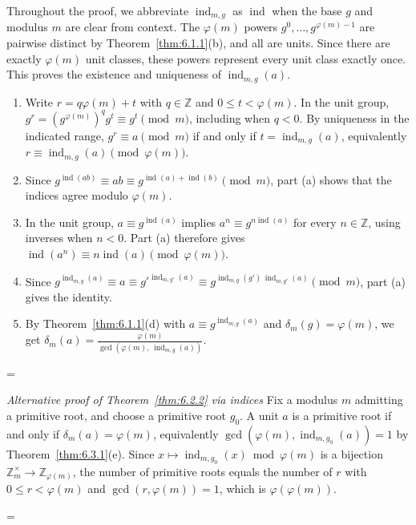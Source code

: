 \documentclass[11pt]{article}
\makeatletter
\theoremstyle{ntstyle}
\let\nt@closedisplay\]
\def\nt@guardedclose{\@ifnextchar\par{\nt@closeafterpar}{\@ifnextchar\end{\postdisplaypenalty\@M\nt@closedisplay}{\nt@closedisplay}}}
\def\nt@closeafterpar\par{\@ifnextchar\par{\nt@closeafterpar}{\@ifnextchar\end{\postdisplaypenalty\@M\nt@closedisplay\par}{\nt@closedisplay\par}}}
\renewenvironment{proof}[1][\proofname]{\par
  \pushQED{\qed}\normalfont\topsep\medskipamount\edef\nt@afterproof{\@endparpenalty=\the\@endparpenalty\relax}\@beginparpenalty\@M\@endparpenalty\@M\let\]\nt@guardedclose\trivlist\item[]\textit{#1\@addpunct{.}} \ignorespaces}{\ifvmode\addpenalty\@M\fi\popQED\nt@afterproof\endtrivlist\@endpefalse}
\newenvironment{altproof}[1][\proofname]{\begin{proof}[#1]\renewcommand{\qedsymbol}{}}{\end{proof}}
\newcommand{\ZmodUnits}[1]{\mathbb{Z}_{#1}^{\times}}
\DeclareMathOperator{\ind}{ind}
\makeatother
\begin{document}
\begin{proof} Throughout the proof, we abbreviate
	$\ind_{m,g}$ as $\ind$ when the base $g$
	and modulus $m$ are clear from context. The
	$\varphi(m)$ powers $g^{0},\ldots,g^{\varphi(m)-1}$ are pairwise
	distinct by Theorem~\ref{thm:6.1.1}(b), and all are units. Since there
	are exactly $\varphi(m)$ unit classes, these powers represent every
	unit class exactly once. This proves the existence and uniqueness of
	$\ind_{m,g}(a)$.

	\begin{enumerate}[label={\alph*)}]
		\item Write $r=q\varphi(m)+t$ with $q\in\mathbb{Z}$ and
		      $0\le t<\varphi(m)$. In the unit group,
		      $g^r=(g^{\varphi(m)})^qg^t\equiv g^t\pmod m$,
		      including when $q<0$. By uniqueness in the indicated range,
		      $g^r\equiv a\pmod m$ if and only if $t=\ind_{m,g}(a)$,
		      equivalently $r\equiv\ind_{m,g}(a)\pmod{\varphi(m)}$.
		\item Since $g^{\ind(ab)} \equiv ab \equiv
			      g^{\ind(a) + \ind(b)} \pmod{m}$, part (a) shows that the indices
		      agree modulo $\varphi(m)$.
		\item In the unit group, $a\equiv g^{\ind(a)}$ implies
		      $a^n\equiv g^{n\ind(a)}$ for every $n\in\mathbb{Z}$,
		      using inverses when $n<0$. Part (a) therefore gives
		      $\ind(a^n)\equiv n\ind(a)\pmod{\varphi(m)}$.
		\item Since $g^{\ind_{m,g}(a)} \equiv a \equiv
			      g'^{\ind_{m,g'}(a)} \equiv
			      g^{\ind_{m,g}(g')\, \ind_{m,g'}(a)} \pmod{m}$,
		      part (a) gives the identity.
		\item By Theorem~\ref{thm:6.1.1}(d) with $a \equiv
			      g^{\ind_{m,g}(a)}$ and $\delta_m(g) = \varphi(m)$,
		      we get $\delta_m(a) = \frac{\varphi(m)}{\gcd(\varphi(m), \, \ind_{m,g}(a))}$.
	\end{enumerate}

\end{proof}
\begin{altproof}[Alternative proof of Theorem~\ref{thm:6.2.2} via indices] Fix a modulus $m$ admitting a primitive root, and choose
	a primitive root $g_0$. A unit $a$ is a primitive root if and only if
	$\delta_m(a)=\varphi(m)$, equivalently
	$\gcd(\varphi(m),\ind_{m,g_0}(a))=1$ by Theorem~\ref{thm:6.3.1}(e). Since
	$x\mapsto\ind_{m,g_0}(x)\bmod\varphi(m)$ is a
	bijection $\ZmodUnits{m}\to\mathbb{Z}_{\varphi(m)}$, the
	number of primitive roots equals the number of $r$ with $0 \le r <
		\varphi(m)$ and $\gcd(r, \varphi(m)) = 1$, which is $\varphi(\varphi(m))$.

\end{altproof}
\end{document}
